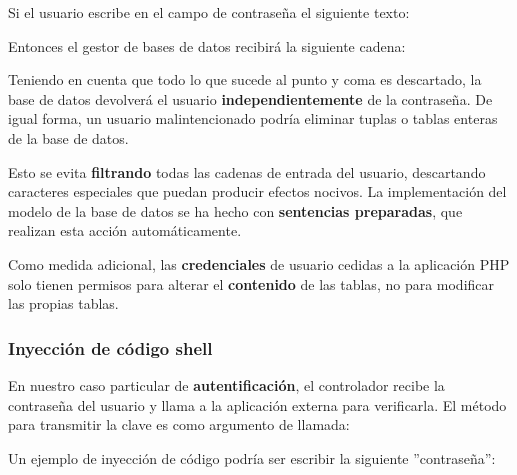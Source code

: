 \begin{center}
\end{center}

Si el usuario escribe en el campo de contraseña el siguiente texto:

\begin{center}
\end{center}

Entonces el gestor de bases de datos recibirá la siguiente cadena:

\begin{center}
\end{center}

Teniendo en cuenta que todo lo que sucede al punto y coma es descartado, la base de datos devolverá el usuario \textbf{independientemente} de la contraseña. De igual forma, un usuario malintencionado podría eliminar tuplas o tablas enteras de la base de datos.

Esto se evita \textbf{filtrando} todas las cadenas de entrada del usuario, descartando caracteres especiales que puedan producir efectos nocivos. La implementación del modelo de la base de datos se ha hecho con \textbf{sentencias preparadas}, que realizan esta acción automáticamente.

Como medida adicional, las \textbf{credenciales} de usuario cedidas a la aplicación PHP solo tienen permisos para alterar el \textbf{contenido} de las tablas, no para modificar las propias tablas.

\subsubsection{Inyección de código shell}

En nuestro caso particular de \textbf{autentificación}, el controlador recibe la contraseña del usuario y llama a la aplicación externa para verificarla. El método para transmitir la clave es como argumento de llamada:

\begin{center}
\end{center}

Un ejemplo de inyección de código podría ser escribir la siguiente ''contraseña'':

\begin{center}
\end{center}

